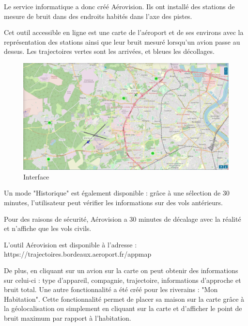 Le service informatique a donc créé Aérovision. Ils ont installé des stations de mesure de bruit dans des endroits habités dans l'axe des pistes.


Cet outil accessible en ligne est une carte de l'aéroport et de ses environs avec la représentation des stations ainsi que leur bruit mesuré lorsqu'un avion passe au dessus. Les trajectoires vertes sont les arrivées, et bleues les décollages.

\begin{figure}[hbt!]
  \centering
  \includegraphics[width=17cm]{Images/aerovision.png}\newline
  \caption{Interface}
  \label{fig:interfaceaerovision}
\end{figure}

\newpage
Un mode "Historique" est également disponible : grâce à une sélection de 30 minutes, l'utilisateur peut vérifier les informations sur des vols antérieurs.

Pour des raisons de sécurité, Aérovision a 30 minutes de décalage avec la réalité et n'affiche que les vols civils.

L'outil Aérovision est disponible à l'adresse : https://trajectoires.bordeaux.aeroport.fr/appmap\newline

De plus, en cliquant sur un avion sur la carte on peut obtenir des informations sur celui-ci : type d'appareil, compagnie, trajectoire, informations d'approche et bruit total.
Une autre fonctionnalité a été créé pour les riverains : "Mon Habitation". Cette fonctionnalité permet de placer sa maison sur la carte grâce à la géolocalisation ou simplement en cliquant sur la carte et d'afficher le point de bruit maximum par rapport à l'habitation.

